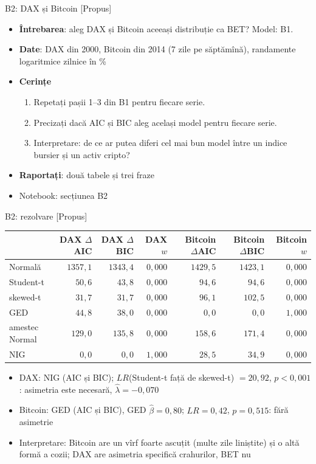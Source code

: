 \begin{frame}{B2: DAX și Bitcoin [Propus]}
\itemsize{\footnotesize}
\begin{itemize}
\item \textbf{Întrebarea}: aleg DAX și Bitcoin aceeași distribuție ca BET? Model: B1.
\item \textbf{Date}: DAX din 2000, Bitcoin din 2014 (7 zile pe săptămînă), randamente logaritmice zilnice în \%
\item \textbf{Cerințe}
\begin{enumerate}
    \item Repetați pașii 1--3 din B1 pentru fiecare serie.
    \item Precizați dacă AIC și BIC aleg același model pentru fiecare serie.
    \item Interpretare: de ce ar putea diferi cel mai bun model între un indice bursier și un activ cripto?
\end{enumerate}
\item \textbf{Raportați}: două tabele și trei fraze
\item Notebook: secțiunea B2
\end{itemize}
\end{frame}

\ifsolutions
\begin{frame}{B2: rezolvare [Propus]}
\itemsize{\footnotesize}
\begin{center}
\scriptsize
\begin{tabular}{lrrrrrr}
\toprule
& DAX $\Delta$AIC & DAX $\Delta$BIC & DAX $w$ & Bitcoin $\Delta$AIC & Bitcoin $\Delta$BIC & Bitcoin $w$ \\
\midrule
Normală & $1357{,}1$ & $1343{,}4$ & $0{,}000$ & $1429{,}5$ & $1423{,}1$ & $0{,}000$ \\
Student-t & $50{,}6$ & $43{,}8$ & $0{,}000$ & $94{,}6$ & $94{,}6$ & $0{,}000$ \\
skewed-t & $31{,}7$ & $31{,}7$ & $0{,}000$ & $96{,}1$ & $102{,}5$ & $0{,}000$ \\
GED & $44{,}8$ & $38{,}0$ & $0{,}000$ & $0{,}0$ & $0{,}0$ & $1{,}000$ \\
amestec Normal & $129{,}0$ & $135{,}8$ & $0{,}000$ & $158{,}6$ & $171{,}4$ & $0{,}000$ \\
NIG & $0{,}0$ & $0{,}0$ & $1{,}000$ & $28{,}5$ & $34{,}9$ & $0{,}000$ \\
\bottomrule
\end{tabular}
\end{center}
\begin{itemize}
    \item DAX: NIG (AIC și BIC); $LR$(Student-t față de skewed-t) $= 20{,}92$, $p <0{,}001$: asimetria este necesară, $\hat\lambda = -0{,}070$
    \item Bitcoin: GED (AIC și BIC), GED $\hat\beta = 0{,}80$; $LR = 0{,}42$, $p = 0{,}515$: fără asimetrie
    \item Interpretare: Bitcoin are un vîrf foarte ascuțit (multe zile liniștite) și o altă formă a cozii; DAX are asimetria specifică crahurilor, BET nu
\end{itemize}
\end{frame}
\fi

